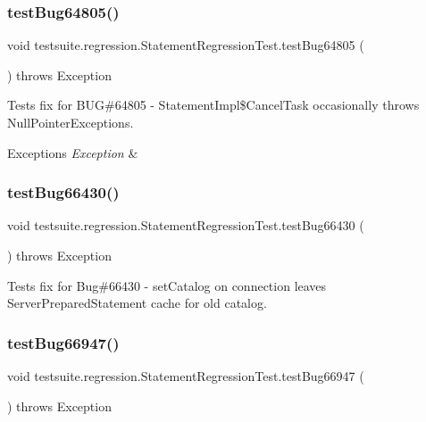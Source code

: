 \subsubsection{\texorpdfstring{test\+Bug64805()}{testBug64805()}}
{\footnotesize\ttfamily void testsuite.\+regression.\+Statement\+Regression\+Test.\+test\+Bug64805 (\begin{DoxyParamCaption}{ }\end{DoxyParamCaption}) throws Exception}

Tests fix for B\+UG\#64805 -\/ Statement\+Impl\$\+Cancel\+Task occasionally throws Null\+Pointer\+Exceptions.


\begin{DoxyExceptions}{Exceptions}
{\em Exception} & \\
\hline
\end{DoxyExceptions}
\mbox{\label{classtestsuite_1_1regression_1_1_statement_regression_test_ae6be3545c08d7afbbad86397d2ef9fb0}} 
\subsubsection{\texorpdfstring{test\+Bug66430()}{testBug66430()}}
{\footnotesize\ttfamily void testsuite.\+regression.\+Statement\+Regression\+Test.\+test\+Bug66430 (\begin{DoxyParamCaption}{ }\end{DoxyParamCaption}) throws Exception}

Tests fix for Bug\#66430 -\/ set\+Catalog on connection leaves Server\+Prepared\+Statement cache for old catalog. \mbox{\label{classtestsuite_1_1regression_1_1_statement_regression_test_a222cfacd79b9dcf61c6ebefe3966ede7}} 
\subsubsection{\texorpdfstring{test\+Bug66947()}{testBug66947()}}
{\footnotesize\ttfamily void testsuite.\+regression.\+Statement\+Regression\+Test.\+test\+Bug66947 (\begin{DoxyParamCaption}{ }\end{DoxyParamCaption}) throws Exception}

